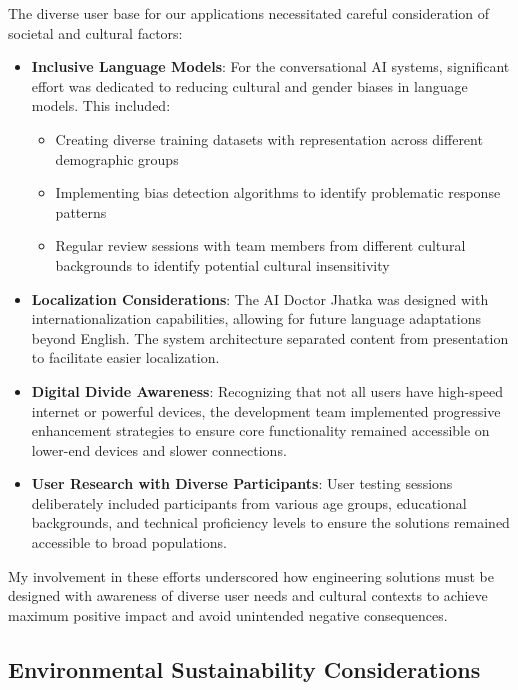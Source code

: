 \documentclass[12pt,a4paper]{article}
\begin{document}
The diverse user base for our applications necessitated careful consideration of societal and cultural factors:

\begin{itemize}
    \item \textbf{Inclusive Language Models}: For the conversational AI systems, significant effort was dedicated to reducing cultural and gender biases in language models. This included:
    \begin{itemize}
        \item Creating diverse training datasets with representation across different demographic groups
        \item Implementing bias detection algorithms to identify problematic response patterns
        \item Regular review sessions with team members from different cultural backgrounds to identify potential cultural insensitivity
    \end{itemize}
    
    \item \textbf{Localization Considerations}: The AI Doctor Jhatka was designed with internationalization capabilities, allowing for future language adaptations beyond English. The system architecture separated content from presentation to facilitate easier localization.
    
    \item \textbf{Digital Divide Awareness}: Recognizing that not all users have high-speed internet or powerful devices, the development team implemented progressive enhancement strategies to ensure core functionality remained accessible on lower-end devices and slower connections.
    
    \item \textbf{User Research with Diverse Participants}: User testing sessions deliberately included participants from various age groups, educational backgrounds, and technical proficiency levels to ensure the solutions remained accessible to broad populations.
\end{itemize}

My involvement in these efforts underscored how engineering solutions must be designed with awareness of diverse user needs and cultural contexts to achieve maximum positive impact and avoid unintended negative consequences.

\subsection{Environmental Sustainability Considerations}
\end{document}
